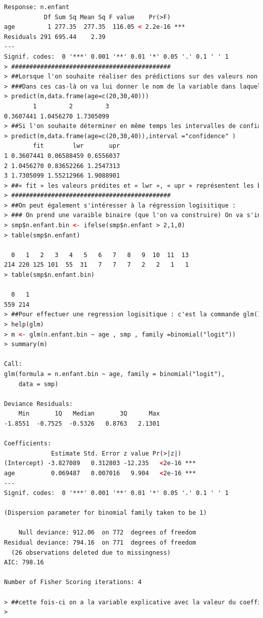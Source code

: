 \begin{lstlisting}[language=html]
Response: n.enfant
           Df Sum Sq Mean Sq F value    Pr(>F)    
age         1 277.35  277.35  116.05 < 2.2e-16 ***
Residuals 291 695.44    2.39                      
---
Signif. codes:  0 '***' 0.001 '**' 0.01 '*' 0.05 '.' 0.1 ' ' 1
> ############################################
> ##Lorsque l'on souhaite réaliser des prédictions sur des valeurs non nécessairement observées on peut utiliser la commande predict().
> ###Dans ces cas-là on va lui donner le nom de la variable dans laquelle on a stocké notre modèle de régression et un data-frame dans lequel on va indiquer pour la variable qui sert de variable explicative les valeurs pour lesquelles on souhaite effectuer la prédiction.
> predict(m,data.frame(age=c(20,30,40)))
        1         2         3 
0.3607441 1.0456270 1.7305099 
> ##Si l'on souhaite déterminer en même temps les intervalles de confiances :
> predict(m,data.frame(age=c(20,30,40)),interval ="confidence" )
        fit        lwr       upr
1 0.3607441 0.06588459 0.6556037
2 1.0456270 0.83652266 1.2547313
3 1.7305099 1.55212966 1.9088901
> ##« fit » les valeurs prédites et « lwr », « upr » représentent les bornes inférieures et supérieures des intervalles de confiance à 95% pour la prévision.
> ############################################
> ##On peut également s'intéresser à la régression logisitique :
> ### On prend une varaible binaire (que l'on va construire) On va s'intéresser au nombre d'enfants supérieur à 2. Dans ces cas-là on codera 1 sinon on code 0
> smp$n.enfant.bin <- ifelse(smp$n.enfant > 2,1,0)
> table(smp$n.enfant)

  0   1   2   3   4   5   6   7   8   9  10  11  13 
214 220 125 101  55  31   7   7   7   2   2   1   1 
> table(smp$n.enfant.bin)

  0   1 
559 214 
> ##Pour effectuer une regression logisitique : c'est la commande glm() : Generalized Linear Models
> help(glm)
> m <- glm(n.enfant.bin ~ age , smp , family =binomial("logit"))
> summary(m)

Call:
glm(formula = n.enfant.bin ~ age, family = binomial("logit"), 
    data = smp)

Deviance Residuals: 
    Min       1Q   Median       3Q      Max  
-1.8551  -0.7525  -0.5326   0.8763   2.1301  

Coefficients:
             Estimate Std. Error z value Pr(>|z|)    
(Intercept) -3.827089   0.312803 -12.235   <2e-16 ***
age          0.069487   0.007016   9.904   <2e-16 ***
---
Signif. codes:  0 '***' 0.001 '**' 0.01 '*' 0.05 '.' 0.1 ' ' 1

(Dispersion parameter for binomial family taken to be 1)

    Null deviance: 912.06  on 772  degrees of freedom
Residual deviance: 794.16  on 771  degrees of freedom
  (26 observations deleted due to missingness)
AIC: 798.16

Number of Fisher Scoring iterations: 4

> ##cette fois-ci on a la variable explicative avec la valeur du coefficient de régression sur l'échelle du log odds.
> 
\end{lstlisting}
